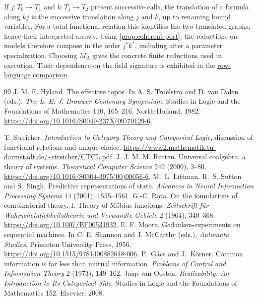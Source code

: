 \documentclass[11pt,a4paper]{article}
\theoremstyle{definition}
\theoremstyle{remark}\newaliascnt{remark}{theorem}
\numberwithin{equation}{section}
\begin{document}
If \(j:T_0\to T_1\) and \(k:T_1\to T_2\) present successive calls, the translation of a formula along \(kj\) is the successive translation along \(j\) and \(k\), up to renaming bound variables. For a total functional relation this identifies the two translated graphs, hence their interpreted arrows. Using \cref{prop:coherent-port}, the reductions on models therefore compose in the order \(j^*k^*\), including after a parameter specialization. Choosing \(M_A\) gives the concrete finite reductions used in execution. Their dependence on the field signature is exhibited in the \hyperref[sec:coherent-row-language]{row-language comparison}.

\clearpage
{}
{}
\begin{thebibliography}{99}
\setlength{\itemsep}{1.2pt plus .3pt minus .3pt}
 J. M. E. Hyland. The effective topos. In A. S. Troelstra and D. van Dalen (eds.), \emph{The L. E. J. Brouwer Centenary Symposium}, Studies in Logic and the Foundations of Mathematics 110, 165--216. North-Holland, 1982. \url{https://doi.org/10.1016/S0049-237X(09)70129-6}.

 T. Streicher. \emph{Introduction to Category Theory and Categorical Logic}, discussion of functional relations and unique choice. \url{https://www2.mathematik.tu-darmstadt.de/~streicher/CTCL.pdf}.
 J. J. M. M. Rutten. Universal coalgebra: a theory of systems. \emph{Theoretical Computer Science} 249 (2000), 3--80. \url{https://doi.org/10.1016/S0304-3975(00)00056-6}.
 M.~L. Littman, R.~S. Sutton and S.~Singh. Predictive representations of state. \emph{Advances in Neural Information Processing Systems} 14 (2001), 1555--1561.
 G.-C. Rota. On the foundations of combinatorial theory. I. Theory of M\"obius functions. \emph{Zeitschrift f\"ur Wahrscheinlichkeitstheorie und Verwandte Gebiete} 2 (1964), 340--368. \url{https://doi.org/10.1007/BF00531932}.
 E. F. Moore. Gedanken-experiments on sequential machines. In C. E. Shannon and J. McCarthy (eds.), \emph{Automata Studies}. Princeton University Press, 1956. \url{https://doi.org/10.1515/9781400882618-006}.
 P.~G\'acs and J.~K\"orner. Common information is far less than mutual information. \emph{Problems of Control and Information Theory} 2 (1973), 149--162.
 Jaap van Oosten. \emph{Realizability: An Introduction to Its Categorical Side}. Studies in Logic and the Foundations of Mathematics 152. Elsevier, 2008.


\end{thebibliography}
\end{document}

